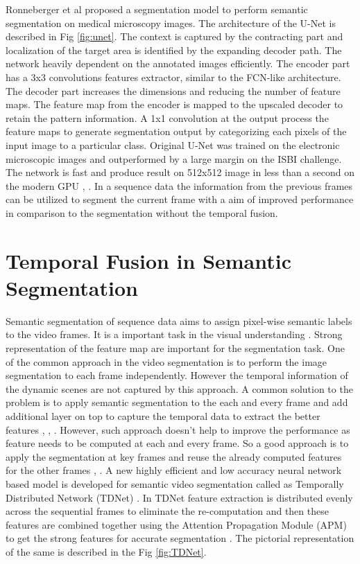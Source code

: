 	 Ronneberger et al \cite{70_ronneberger2015u} proposed a segmentation model to perform semantic segmentation on medical microscopy images. The architecture of the U-Net is described in Fig \ref{fig:unet}. The context is captured by the contracting part and localization of the target area is identified by the expanding decoder path. The network heavily dependent on the annotated images efficiently. The encoder part has a 3x3 convolutions features extractor, similar to the FCN-like architecture. The decoder part increases the dimensions and reducing the number of feature maps. The feature map from the encoder is mapped to the upscaled decoder to retain the pattern information. A 1x1 convolution at the output process the feature maps to generate segmentation output by categorizing each pixels of the input image to a particular class. Original U-Net was trained on the electronic microscopic images and outperformed by a large margin on the ISBI challenge. The network is fast and produce result on 512x512 image in less than a second on the modern GPU \cite{70_ronneberger2015u}, \cite{60_minaee2021image}. In a sequence data the information from the previous frames can be utilized to segment the current frame with a aim of improved performance in comparison to the segmentation without the temporal fusion. 
	 
    \section{Temporal Fusion in Semantic Segmentation}
    
    Semantic segmentation of sequence data aims to assign pixel-wise semantic labels to the video frames. It is a important task in the visual understanding \cite{72_jin2017video}. Strong representation of the feature map are important for the segmentation task. One of the common approach in the video segmentation is to perform the image segmentation to each frame independently. However the temporal information of the dynamic scenes are not captured by this approach. A common solution to the problem is to apply semantic segmentation to the each and every frame and add additional layer on top to capture the temporal data to extract the better features \cite{73_gadde2017semantic}, \cite{74_jin2017video}, \cite{75_nilsson2018semantic}. However, such approach doesn't help to improve the performance as feature needs to be computed at each and every frame. So a good approach is to apply the segmentation at key frames and reuse the already computed features for the other frames \cite{76_jain2019accel}, \cite{77_mahasseni2017budget}. A new highly efficient and low accuracy neural network based model is developed for semantic video segmentation called as Temporally Distributed Network (TDNet) \cite{78_hu2020temporally}. In TDNet feature extraction is distributed evenly across the sequential frames to eliminate the re-computation and then these features are combined together using the Attention Propagation Module (APM) to get the strong features for accurate segmentation \cite{78_hu2020temporally}. The pictorial representation of the same is described in the Fig \ref{fig:TDNet}. 
    
